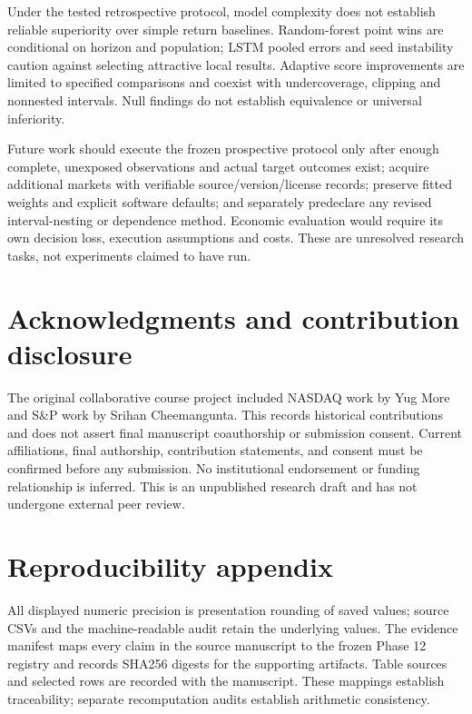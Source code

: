 \documentclass[11pt]{article}
\begin{document}
Under the tested retrospective protocol, model complexity does not establish reliable superiority over simple return baselines. Random-forest point wins are conditional on horizon and population; LSTM pooled errors and seed instability caution against selecting attractive local results. Adaptive score improvements are limited to specified comparisons and coexist with undercoverage, clipping and nonnested intervals. Null findings do not establish equivalence or universal inferiority.

Future work should execute the frozen prospective protocol only after enough complete, unexposed observations and actual target outcomes exist; acquire additional markets with verifiable source/version/license records; preserve fitted weights and explicit software defaults; and separately predeclare any revised interval-nesting or dependence method. Economic evaluation would require its own decision loss, execution assumptions and costs. These are unresolved research tasks, not experiments claimed to have run.

\section*{Acknowledgments and contribution disclosure}

The original collaborative course project included NASDAQ work by Yug More and S\&P work by Srihan Cheemangunta. This records historical contributions and does not assert final manuscript coauthorship or submission consent. Current affiliations, final authorship, contribution statements, and consent must be confirmed before any submission. No institutional endorsement or funding relationship is inferred. This is an unpublished research draft and has not undergone external peer review.



\section*{Reproducibility appendix}

All displayed numeric precision is presentation rounding of saved values; source CSVs and the machine-readable audit retain the underlying values. The evidence manifest maps every claim in the source manuscript to the frozen Phase 12 registry and records SHA256 digests for the supporting artifacts. Table sources and selected rows are recorded with the manuscript. These mappings establish traceability; separate recomputation audits establish arithmetic consistency.
\end{document}
